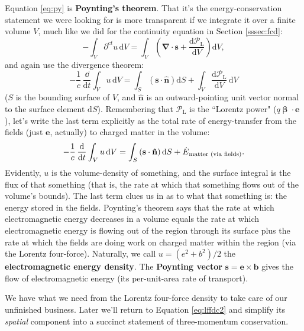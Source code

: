 \documentclass[12pt]{article}
\renewcommand{\vv}[1]{\mathbf{#1}}
\newcommand{\dd}[1]{\mathrm{d}#1}
\newcommand{\vvbeta}{\bm{\upbeta}}
\newcommand{\del}{\boldsymbol{\nabla}}
\begin{document}
Equation \ref{eq:py} is \textbf{Poynting's theorem}. That it's the energy-conservation statement we were looking for is more transparent if we integrate it over a finite volume $V$, much like we did for the continuity equation in Section \ref{sssec:fcd}:
\begin{equation*}
- \int_V \partial^{ct} u \, \dd V = \int_V \left(  \del \cdot \vv s + \dfrac{\dd \mathcal{P}_{\textrm{L}}}{\dd V} \right) \dd V ,
\end{equation*}
and again use the divergence theorem:
\begin{equation*}
- \dfrac{1}{c} \, \dfrac{\dd}{\dd t} \int_V u \, \dd V = \int_S \left( \vv s \cdot \vv{\hat{n}} \right) \dd S + \int_V \dfrac{\dd \mathcal{P}_{\textrm{L}}}{\dd V} \, \dd V
\end{equation*}
($S$ is the bounding surface of $V$, and $\vv{\hat{n}}$ is an outward-pointing unit vector normal to the surface element $\dd S$). Remembering that $\mathcal{P}_{\textrm{L}}$ is the ``Lorentz power" ($q \vvbeta \cdot \vv e$), let's write the last term explicitly as the total rate of energy-transfer from the fields (just $\vv e$, actually) to charged matter in the volume:
\begin{equation*}
- \dfrac{1}{c} \, \dfrac{\dd}{\dd t} \int_V u \, \dd V = \int_S \left( \vv s \cdot \vv{\hat{n}} \right) \dd S + \dot{E}_{\mkern1mu \textrm{matter (via fields)}} .
\end{equation*}
Evidently, $u$ is the volume-density of something, and the surface integral is the flux of that something (that is, the rate at which that something flows out of the volume's bounds). The last term clues us in as to what that something is: the energy stored in the fields. Poynting's theorem says that the rate at which electromagnetic energy decreases in a volume equals the rate at which electromagnetic energy is flowing out of the region through its surface plus the rate at which the fields are doing work on charged matter within the region (via the Lorentz four-force). Naturally, we call $u = (e^2 + b^2)/2$ the \textbf{electromagnetic energy density}. The \textbf{Poynting vector} $\vv s = \vv e \times \vv b$ gives the flow of electromagnetic energy (its per-unit-area rate of transport).

We have what we need from the Lorentz four-force density to take care of our unfinished business. Later we'll return to Equation \ref{eq:lffdc2} and simplify its \emph{spatial} component into a succinct statement of three-momentum conservation.
\end{document}
